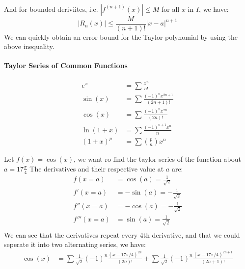 \documentclass[11pt]{report}
\begin{document}
\paragraph{} And for bounded deriviites, i.e. $|f^{(n+1)}(x)| \le M$ for all $x$ in $I$, we have:
\begin{equation}
    |R_n(x)| \le \frac{M}{(n+1)!} |x-a|^{n+1}
\end{equation}
We can quickly obtain an error bound for the Taylor polynomial by using the above inequality.
\paragraph{Taylor Series of Common Functions}
\begin{align}
    e^x &= \sum \frac{x^n}{n!} \\
    \sin(x) &= \sum \frac{(-1)^n x^{2n+1}}{(2n+1)!} \\
    \cos(x) &= \sum \frac{(-1)^n x^{2n}}{(2n)!} \\
    \ln(1+x) &= \sum \frac{(-1)^{n+1} x^n}{n} \\
    (1+x)^p &= \sum \binom{p}{n} x^n
\end{align}
\begin{example}
    Let $f(x) = \cos(x)$, we want ro find the taylor series of the function about $a=17\frac{\pi}{4}$ The derivatives and their respective value at $a$ are:
    \begin{align*}
        f(x=a) &= \cos(a) = \frac{1}{\sqrt{2}} \\
        f'(x=a) &= -\sin(a) = -\frac{1}{\sqrt{2}} \\    
        f''(x=a) &= -\cos(a) = -\frac{1}{\sqrt{2}} \\
        f'''(x=a) &= \sin(a) = \frac{1}{\sqrt{2}} \\
    \end{align*}
    We can see that the derivatives repeat every 4th derivative, and that we could seperate it into two alternating series, we have:
    \begin{align*}
        \cos(x) &= \sum \frac{1}{\sqrt{2}} (-1)^n \frac{(x-17\pi/4)^{2n}}{(2n)!} + \sum \frac{1}{\sqrt{2}} (-1)^n \frac{(x-17\pi/4)^{2n+1}}{(2n+1)!} \\
    \end{align*}
\end{example}
\end{document}
